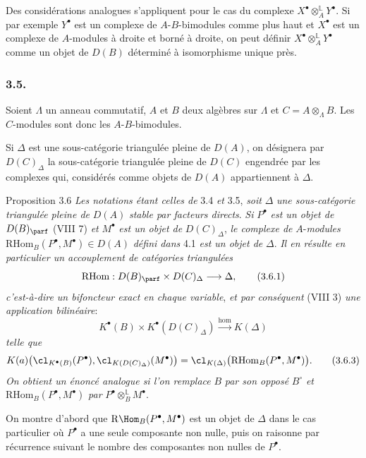 Des considérations analogues s'appliquent pour le cas du complexe $X^\bullet\otimes_A^{\mathbb{L}}Y^\bullet$. Si par exemple $Y^\bullet$ est un complexe de $A$-$B$-bimodules comme plus haut et $X^\bullet$ est un complexe de $A$-modules à droite et borné à droite, on peut définir $X^\bullet\otimes_A^{\mathbb{L}}Y^\bullet$ comme un objet de $D(B)$ déterminé à isomorphisme unique près.

\subsubsection*{3.5.}

Soient $\Lambda$ un anneau commutatif, $A$ et $B$ deux algèbres sur $\Lambda$ et
$C=A\otimes_{\Lambda}B$. Les $C$-modules sont donc les $A$-$B$-bimodules.

Si $\Delta$ est une sous-catégorie triangulée pleine de $D(A)$, on désignera par $D(C)_{\Delta}$ la sous-catégorie triangulée pleine de $D(C)$ engendrée par les complexes qui, considérés comme objets de $D(A)$ appartiennent à $\Delta$.

\begin{statement}{Proposition 3.6}
\emph{Les notations étant celles de} 3.4 \emph{et} 3.5, \emph{soit} $\Delta$ \emph{une sous-catégorie triangulée pleine de} $D(A)$ \emph{stable par facteurs directs}. \emph{Si} $P^\bullet$ \emph{est un objet de} $D(B)_{\parf}$ (VIII 7) \emph{et} $M^\bullet$ \emph{est un objet de} $D(C)_{\Delta}$, \emph{le complexe de} $A$-\emph{modules} $\mathrm{RHom}_B(P^\bullet,M^\bullet)\in D(A)$ \emph{défini dans} 4.1 \emph{est un objet de} $\Delta$. \emph{Il en résulte en particulier un accouplement de catégories triangulées}
\[
\mathrm{RHom}:D(B)_{\parf}\times D(C)_{\Delta}\longrightarrow \Delta,
\tag{3.6.1}
\]
\emph{c'est-à-dire un bifoncteur exact en chaque variable}, \emph{et par conséquent} (VIII 3) \emph{une application bilinéaire}:
\[
K^{\bullet}(B)\times K^{\bullet}(D(C)_{\Delta})\xrightarrow{\operatorname{hom}} K(\Delta)
\tag{3.6.2}
\]
\emph{telle que}
\[
K(a)\bigl(\cl_{K^{\bullet}(B)}(P^\bullet),\cl_{K(D(C)_{\Delta})}(M^\bullet)\bigr)
=\cl_{K(\Delta)}\bigl(\mathrm{RHom}_B(P^\bullet,M^\bullet)\bigr).
\tag{3.6.3}
\]
\emph{On obtient un énoncé analogue si l'on remplace} $B$ \emph{par son opposé} $B^\circ$ \emph{et} $\mathrm{RHom}_B(P^\bullet,M^\bullet)$ \emph{par} $P^\bullet\otimes_B^{\mathbb{L}}M^\bullet$.
\end{statement}

\begin{prooftext}[Démonstration]
On montre d'abord que $\mathrm{R}\Hom_B(P^\bullet,M^\bullet)$ est un objet de $\Delta$ dans le cas particulier où $P^\bullet$ a une seule composante non nulle, puis on raisonne par récurrence suivant le nombre des composantes non nulles de $P^\bullet$.
\end{prooftext}

